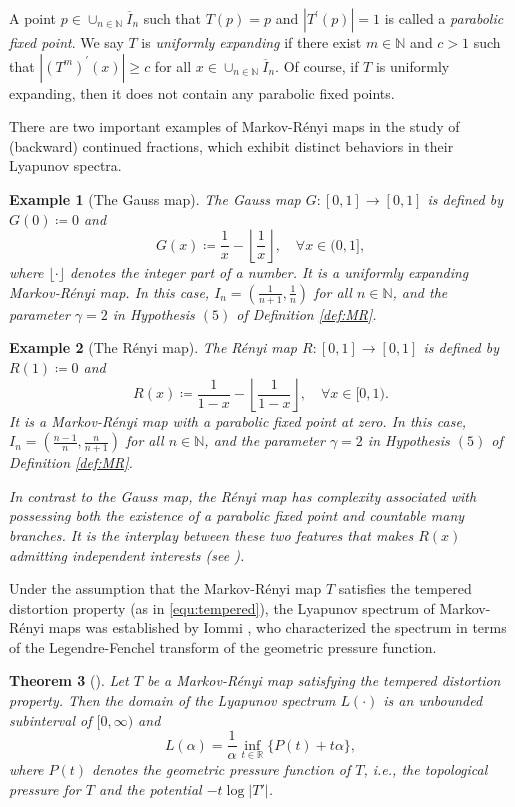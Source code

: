 \documentclass[12pt,reqno]{amsart}
\renewcommand{\=}{\coloneqq}
\theoremstyle{plain}
\newtheorem{theorem}{Theorem}[section]
\newtheorem{example}[theorem]{Example}
\begin{document}
A point $p\in \cup_{n \in \mathbb N}\overline{I}_n$ such that $T(p)=p$ and $|T^\prime(p)| = 1$ is called a \emph{parabolic fixed point}. We say $T$ is \emph{uniformly expanding} if there exist $m\in \mathbb{N}$ and $c>1$ such that $|(T^m)^\prime(x)|\geq c$ for all $x\in \cup_{n \in \mathbb N}\overline{I}_n$. Of course, if $T$ is uniformly expanding, then it does not contain any parabolic fixed points.

There are two important examples of Markov-R\'{e}nyi maps in the study of (backward) continued fractions, which exhibit distinct behaviors in their Lyapunov spectra.


\begin{example}[The Gauss map]
The Gauss map $G: [0,1] \to [0,1]$ is defined by $G(0)\coloneqq 0$ and
\[
G(x)\coloneqq
    \frac{1}{x}-  \left\lfloor\frac{1}{x}\right\rfloor,\quad \forall x\in (0,1],
\]
where $\lfloor \cdot\rfloor$ denotes the integer part of a number. It is a uniformly expanding Markov-R\'{e}nyi map.
In this case, $I_n=(\frac{1}{n+1}, \frac{1}{n})$ for all $n \in \mathbb N$, and the parameter $\gamma=2$ in Hypothesis $(5)$ of Definition \ref{def:MR}.
\end{example}


\begin{example}[The R\'{e}nyi map]
The R\'{e}nyi map $R: [0,1] \to [0,1]$ is defined by $R(1)\coloneqq 0$ and
\[
R(x)\coloneqq \frac{1}{1-x}-  \left\lfloor\frac{1}{1-x}\right\rfloor,\quad \forall x\in [0,1).
\]
It is a Markov-R\'{e}nyi map with a parabolic fixed point at zero. In this case, $I_n=(\frac{n-1}{n}, \frac{n}{n+1})$ for all $n \in \mathbb N$, and the parameter $\gamma=2$ in Hypothesis $(5)$ of Definition \ref{def:MR}.

In contrast to the Gauss map, the R\'{e}nyi map has complexity associated with possessing both the existence of a parabolic fixed point and countable many branches. It is the interplay between these two features that makes $R(x)$ admitting independent interests (see \cite{AF,BL,GH,Renyi}).
\end{example}



Under the assumption that the Markov-R\'{e}nyi map $T$ satisfies the tempered distortion property (as in \eqref{equ:tempered}), the Lyapunov spectrum of Markov-R\'{e}nyi maps was established by Iommi \cite{Iommi}, who characterized the spectrum in terms of the Legendre-Fenchel transform of the geometric pressure function.


\begin{theorem}[{\cite[Theorem 4.1]{Iommi}}]\label{IomLS}
Let $T$ be a Markov-R\'{e}nyi map satisfying the tempered distortion property. Then the domain of the Lyapunov spectrum $L(\cdot)$ is an unbounded subinterval of $[0,\infty)$ and
$$
L(\alpha)=\frac{1}{\alpha} \inf_{t \in \mathbb R}\big\{P(t) +t\alpha\big\},
$$
where $P(t)$ denotes the geometric pressure function of $T$, i.e., the topological pressure for $T$ and the potential $-t\log|T'|$.
\end{theorem}
\end{document}
